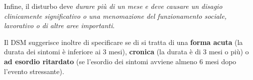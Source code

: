 Infine, il disturbo deve \emph{durare più di un mese e deve causare un
disagio clinicamente significativo o una menomazione del funzionamento
sociale, lavorativo o di altre aree importanti}.

Il DSM suggerisce inoltre di specificare se di si tratta di una
\textbf{forma acuta} (la durata dei sintomi è inferiore ai 3 mesi),
\textbf{cronica} (la durata è di 3 mesi o più) o \textbf{ad esordio
ritardato} (se l'esordio dei sintomi avviene almeno 6 mesi dopo l'evento
stressante).
